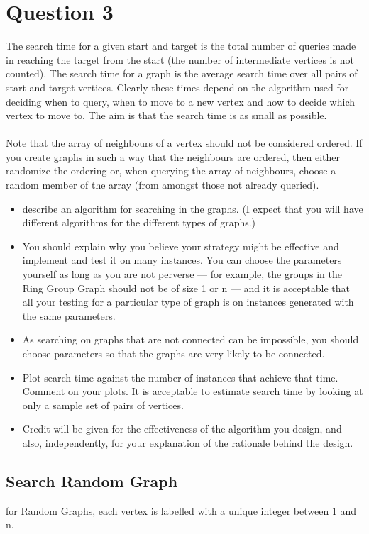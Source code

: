\documentclass[11pt,a4paper,notitlepage]{article}
\begin{document}
\section*{Question 3}
The search time for a given start and target is the total number of queries made in reaching the target from the start (the number of intermediate vertices is not counted). The search time for a graph is the average search time over all pairs of start and target vertices. Clearly these times depend on the algorithm used for deciding when to query, when to move to a new vertex and how to decide which vertex to move to. The aim is that the search time is as small as possible.\\ \\
\noindent
Note that the array of neighbours of a vertex should not be considered ordered. If you create graphs in such a way that the neighbours are ordered, then either randomize the ordering or, when querying the array of neighbours, choose a random member of the array (from amongst those not already queried).

\begin{itemize}
    \item describe an algorithm for searching in the graphs. (I expect that you will have different algorithms for the different types of graphs.) 
    \item You should explain why you believe your strategy might be effective and implement and test it on many instances. You can choose the parameters yourself as long as you are not perverse — for example, the groups in the Ring Group Graph should not be of size 1 or n — and it is acceptable that all your testing for a particular type of graph is on instances generated with the same parameters. 
    \item As searching on graphs that are not connected can be impossible, you should choose parameters so that the graphs are very likely to be connected. 
    \item Plot search time against the number of instances that achieve that time. Comment on your plots. It is acceptable to estimate search time by looking at only a sample set of pairs of vertices. 
    \item Credit will be given for the effectiveness of the algorithm you design, and also, independently, for your explanation of the rationale behind the design.
\end{itemize}

\subsection*{Search Random Graph}
for Random Graphs, each vertex is labelled with a unique integer between 1 and n.
\end{document}
